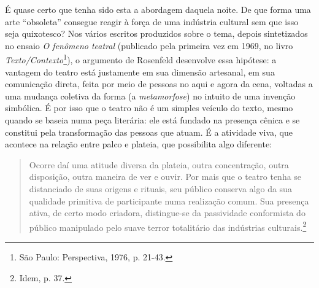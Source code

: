 É quase certo que tenha sido esta a abordagem daquela noite. De que
forma uma arte “obsoleta” consegue reagir à força de uma indústria
cultural sem que isso seja quixotesco? Nos vários escritos produzidos
sobre o tema, depois sintetizados no ensaio \textit{O fenômeno teatral}
(publicado pela primeira vez em 1969, no livro
\textit{Texto/Contexto}\footnote{São Paulo: Perspectiva, 1976, p. 21-43.}),
o argumento de Rosenfeld desenvolve essa hipótese: a vantagem do teatro
está justamente em sua dimensão artesanal, em sua comunicação direta,
feita por meio de pessoas no aqui e agora da cena, voltadas a uma
mudança coletiva da forma (a \textit{metamorfose}) no intuito de uma
invenção simbólica. É por isso que o teatro não é um simples veículo do
texto, mesmo quando se baseia numa peça literária: ele está fundado na
presença cênica e se constitui pela transformação das pessoas que atuam.
É a atividade viva, que acontece na relação entre palco e plateia, que
possibilita algo diferente:

\begin{quote}
Ocorre daí uma atitude diversa da plateia, outra concentração, outra
disposição, outra maneira de ver e ouvir. Por mais que o teatro tenha se
distanciado de suas origens e rituais, seu público conserva algo da sua
qualidade primitiva de participante numa realização comum. Sua presença
ativa, de certo modo criadora, distingue-se da passividade conformista
do público manipulado pelo suave terror totalitário das indústrias
culturais.\footnote{Idem, p. 37.}
\end{quote}

